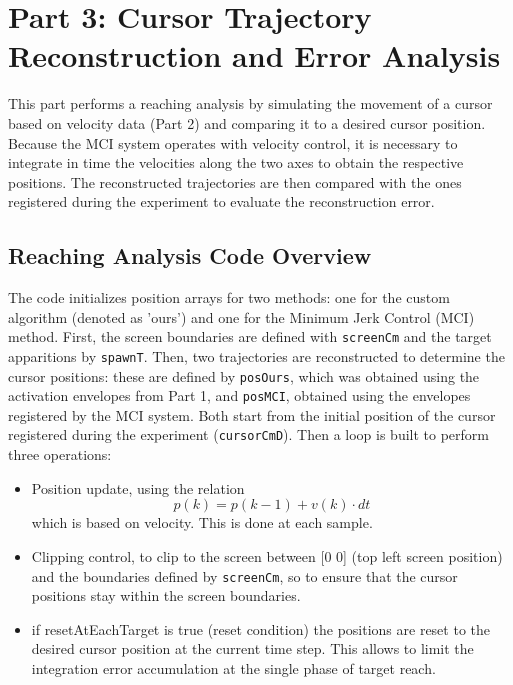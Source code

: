 \vspace{10pt}
\section{Part 3: Cursor Trajectory Reconstruction and Error Analysis}

This part performs a reaching analysis by simulating the movement of a cursor based on velocity data (Part 2) and comparing it to a desired cursor position.
Because the MCI system operates with velocity control, it is necessary to integrate in time the velocities along the two axes to obtain the respective positions. The reconstructed trajectories are then compared with the ones registered during the experiment to evaluate the reconstruction error.

\subsection{Reaching Analysis Code Overview} 

 The code initializes position arrays for two methods: one for the custom algorithm (denoted as 'ours') and one for the Minimum Jerk Control (MCI) method. 
 First, the screen boundaries are defined with \texttt{screenCm} and the target apparitions by \texttt{spawnT}.  
 Then, two trajectories are reconstructed to determine the cursor positions: these are defined by \texttt{posOurs}, which was obtained using the activation envelopes from Part 1, and \texttt{posMCI}, obtained using the envelopes registered by the MCI system. Both start from the initial position of the cursor registered during the experiment (\texttt{cursorCmD}). Then a loop is built to perform three operations:
 \begin{itemize}
    \item Position update, using the relation \begin{equation}
                                                p(k) = p(k-1) + v(k) \cdot dt
                                              \end{equation}
          which is based on velocity. This is done at each sample.
    \item Clipping control, to clip to the screen between [0 0] (top left             screen position) and the boundaries defined by \texttt{screenCm}, so        to ensure that the cursor positions stay within the screen                  boundaries. 
    \item if resetAtEachTarget is true (reset condition) the positions are            reset to the desired cursor position at the current time step. This         allows to limit the integration error accumulation at the single            phase of target reach.
\end{itemize} 

